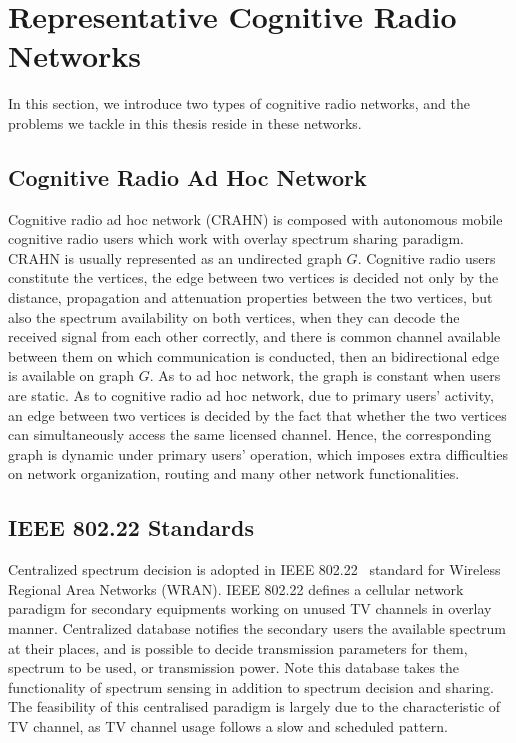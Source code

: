 \section{Representative Cognitive Radio Networks}
In this section, we introduce two types of cognitive radio networks, and the problems we tackle in this thesis reside in these networks.

\subsection{Cognitive Radio Ad Hoc Network}


Cognitive radio ad hoc network (CRAHN) is composed with autonomous mobile cognitive radio users which work with overlay spectrum sharing paradigm.
CRAHN is usually represented as an undirected graph $G$.
Cognitive radio users constitute the vertices, the edge between two vertices is decided not only by the distance, propagation and attenuation properties between the two vertices, but also the spectrum availability on both vertices, \ie when they can decode the received signal from each other correctly, and there is common channel available between them on which communication is conducted, then an bidirectional edge is available on graph $G$.
As to ad hoc network, the graph is constant when users are static.
As to cognitive radio ad hoc network, due to primary users' activity, an edge between two vertices is decided by the fact that whether the two vertices can simultaneously access the same licensed channel.
Hence, the corresponding graph is dynamic under primary users' operation, which imposes extra difficulties on network organization, routing and many other network functionalities.

\subsection{IEEE 802.22 Standards}
Centralized spectrum decision is adopted in IEEE 802.22~\cite{802.22} standard for Wireless Regional Area Networks (WRAN).
IEEE 802.22 defines a cellular network paradigm for secondary equipments working on unused TV channels in overlay manner.
Centralized database notifies the secondary users the available spectrum at their places, and is possible to decide transmission parameters for them, \ie spectrum to be used, or transmission power.
Note this database takes the functionality of spectrum sensing in addition to spectrum decision and sharing.
The feasibility of this centralised paradigm is largely due to the characteristic of TV channel, as TV channel usage follows a slow and scheduled pattern. 

